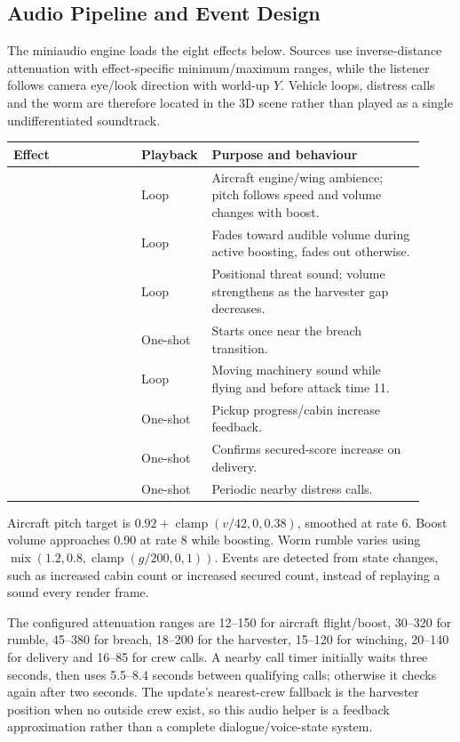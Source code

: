\subsection{Audio Pipeline and Event Design}
The miniaudio engine loads the eight effects below. Sources use inverse-distance attenuation with effect-specific minimum/maximum ranges, while the listener follows camera eye/look direction with world-up $Y$. Vehicle loops, distress calls and the worm are therefore located in the 3D scene rather than played as a single undifferentiated soundtrack.
\begin{longtable}{L{0.30\linewidth}L{0.12\linewidth}L{0.50\linewidth}}
\toprule\textbf{Effect}&\textbf{Playback}&\textbf{Purpose and behaviour}\\\midrule\endhead
{} & Loop & Aircraft engine/wing ambience; pitch follows speed and volume changes with boost.\\
 & Loop & Fades toward audible volume during active boosting, fades out otherwise.\\
 & Loop & Positional threat sound; volume strengthens as the harvester gap decreases.\\
 & One-shot & Starts once near the breach transition.\\
 & Loop & Moving machinery sound while flying and before attack time 11.\\
 & One-shot & Pickup progress/cabin increase feedback.\\
 & One-shot & Confirms secured-score increase on delivery.\\
 & One-shot & Periodic nearby distress calls.\\
\bottomrule
\end{longtable}
Aircraft pitch target is $0.92+\operatorname{clamp}(v/42,0,0.38)$, smoothed at rate 6. Boost volume approaches 0.90 at rate 8 while boosting. Worm rumble varies using $\operatorname{mix}(1.2,0.8,\operatorname{clamp}(g/200,0,1))$. Events are detected from state changes, such as increased cabin count or increased secured count, instead of replaying a sound every render frame.

The configured attenuation ranges are 12--150 for aircraft flight/boost, 30--320 for rumble, 45--380 for breach, 18--200 for the harvester, 15--120 for winching, 20--140 for delivery and 16--85 for crew calls. A nearby call timer initially waits three seconds, then uses 5.5--8.4 seconds between qualifying calls; otherwise it checks again after two seconds. The update's nearest-crew fallback is the harvester position when no outside crew exist, so this audio helper is a feedback approximation rather than a complete dialogue/voice-state system.

